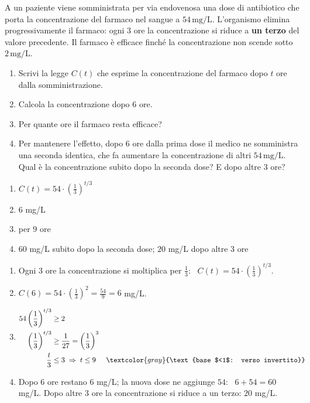 
\begin{question}[ID=6.2, subtitle={Concentrazione di un farmaco nel sangue}, difficulty=difficile, tags={problemi, esponenziali, decadimento, farmaco}]
A un paziente viene somministrata per via endovenosa una dose di antibiotico che porta la concentrazione del farmaco nel sangue a $54\,\text{mg/L}$. L'organismo elimina progressivamente il farmaco: ogni $3$ ore la concentrazione si riduce a \textbf{un terzo} del valore precedente. Il farmaco è efficace finché la concentrazione non scende sotto $2\,\text{mg/L}$.
\begin{enumerate}[label=\alph*),leftmargin=1.8cm]
    \item Scrivi la legge $C(t)$ che esprime la concentrazione del farmaco dopo $t$ ore dalla somministrazione.
    \item Calcola la concentrazione dopo $6$ ore.
    \item Per quante ore il farmaco resta efficace?
    \item Per mantenere l'effetto, dopo $6$ ore dalla prima dose il medico ne somministra una seconda identica, che fa aumentare la concentrazione di altri $54\,\text{mg/L}$. Qual è la concentrazione subito dopo la seconda dose? E dopo altre $3$ ore?
\end{enumerate}
\begin{solution}
\begin{enumerate}[label=\alph*),leftmargin=1.8cm]
    \item $C(t)=54\cdot\left(\tfrac13\right)^{t/3}$
    \item $6$ mg/L
    \item per $9$ ore
    \item $60$ mg/L subito dopo la seconda dose; $20$ mg/L dopo altre $3$ ore
\end{enumerate}
\end{solution}
\begin{explanation}
\begin{enumerate}[label=\alph*),leftmargin=1.8cm]
    \item Ogni $3$ ore la concentrazione si moltiplica per $\tfrac13$: \ $C(t)=54\cdot\left(\tfrac13\right)^{t/3}$.
    \item $C(6)=54\cdot\left(\tfrac13\right)^2=\tfrac{54}{9}=6$ mg/L.
    \item \[\begin{aligned}
    54\left(\dfrac13\right)^{t/3} &\geq 2\\
    \left(\dfrac13\right)^{t/3} &\geq \dfrac1{27}=\left(\dfrac13\right)^3\\
    \dfrac t3 &\leq 3 \;\Rightarrow\; t\leq9 && \textcolor{gray}{\text{base $<1$: verso invertito}}
    \end{aligned}\]
    \item Dopo $6$ ore restano $6$ mg/L; la nuova dose ne aggiunge $54$: \ $6+54=60$ mg/L. Dopo altre $3$ ore la concentrazione si riduce a un terzo: $20$ mg/L.
\end{enumerate}
\end{explanation}
\end{question}

